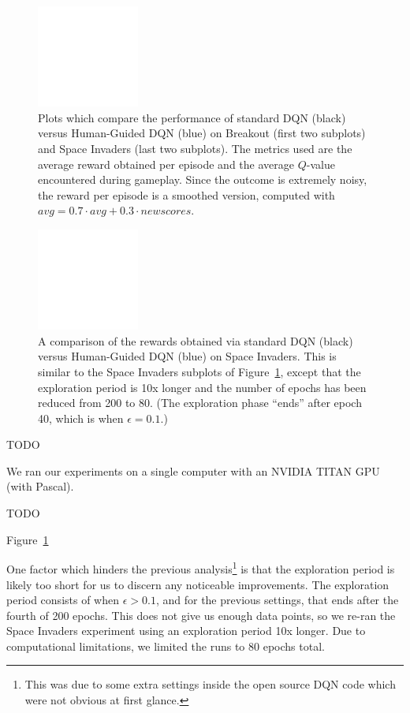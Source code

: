 \documentclass[letterpaper, 10pt, conference]{ieeeconf}
\begin{document}
\begin{figure}[t]
\centering
\includegraphics[width=0.30\textwidth]{figures/empty.png}
\caption{\footnotesize
Plots which compare the performance of standard DQN (black) versus Human-Guided
DQN (blue) on Breakout (first two subplots) and Space Invaders (last two
subplots). The metrics used are the average reward obtained per episode
and the average $Q$-value encountered during gameplay. Since the outcome is
extremely noisy, the reward per episode is a smoothed version, computed with
$avg = 0.7\cdot avg + 0.3\cdot newscores$.
}
\label{fig:human_dqn_performance}
\end{figure}

\begin{figure}[t]
\centering
\includegraphics[width=0.30\textwidth]{figures/empty.png}
\caption{\footnotesize
A comparison of the rewards obtained via standard DQN (black) versus
Human-Guided DQN (blue) on Space Invaders. This is similar to the Space Invaders
subplots of Figure~\ref{fig:human_dqn_performance}, except that the exploration
period is 10x longer and the number of epochs has been reduced from 200 to 80.
(The exploration phase ``ends'' after epoch 40, which is when $\epsilon=0.1$.)
}
\label{fig:sp_inv_longer_exploration}
\end{figure}

TODO

We ran our experiments on a single computer with an NVIDIA TITAN GPU (with
Pascal).

TODO

Figure~\ref{fig:human_dqn_performance}

One factor which hinders the previous analysis\footnote{This was due to some
extra settings inside the open source DQN code which were not obvious at first
glance.} is that the exploration period is likely too short for us to discern
any noticeable improvements. The exploration period consists of when
$\epsilon>0.1$, and for the previous settings, that ends after the fourth of 200
epochs. This does not give us enough data points, so we re-ran the Space
Invaders experiment using an exploration period 10x longer. Due to computational
limitations, we limited the runs to 80 epochs total.
\end{document}
